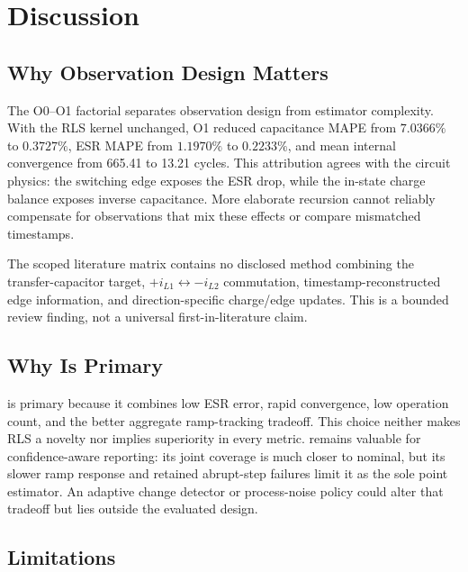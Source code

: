 \section{Discussion}
\label{sec:discussion}

\subsection{Why Observation Design Matters}

The O0--O1 factorial separates observation design from estimator complexity. With the RLS kernel unchanged, O1 reduced capacitance MAPE from $7.0366\%$ to $0.3727\%$, ESR MAPE from $1.1970\%$ to $0.2233\%$, and mean internal convergence from 665.41 to 13.21 cycles. This attribution agrees with the circuit physics: the switching edge exposes the ESR drop, while the in-state charge balance exposes inverse capacitance. More elaborate recursion cannot reliably compensate for observations that mix these effects or compare mismatched timestamps.

The scoped literature matrix contains no disclosed method combining the \Cuk{} transfer-capacitor target, $+i_{L1}\leftrightarrow-i_{L2}$ commutation, timestamp-reconstructed edge information, and direction-specific charge/edge updates. This is a bounded review finding, not a universal first-in-literature claim.

\subsection{Why \TSRLS{} Is Primary}

\TSRLS{} is primary because it combines low ESR error, rapid convergence, low operation count, and the better aggregate ramp-tracking tradeoff. This choice neither makes RLS a novelty nor implies superiority in every metric. \TSKF{} remains valuable for confidence-aware reporting: its joint coverage is much closer to nominal, but its slower ramp response and retained abrupt-step failures limit it as the sole point estimator. An adaptive change detector or process-noise policy could alter that tradeoff but lies outside the evaluated design.

\subsection{Limitations}

